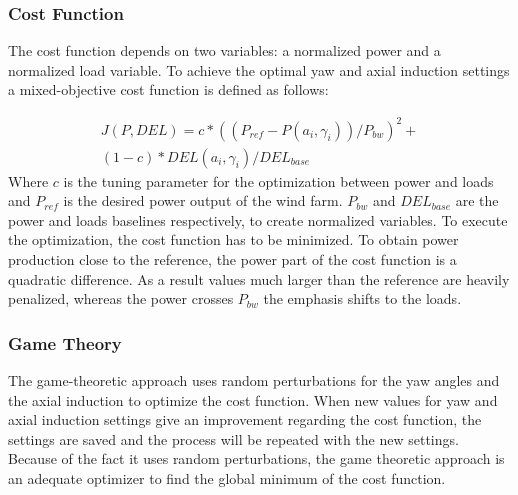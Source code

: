 \subsubsection{Cost Function} \label{sec:costfunction}
The cost function depends on two variables: a normalized power and a normalized load variable. To achieve the optimal yaw and axial induction settings a mixed-objective cost function is defined as follows:

\begin{equation}
\begin{aligned}
J(P,DEL) = c*((P_{ref}-P(a_i,\gamma_i))/P_{bw})^2  + \\
(1-c)*DEL(a_i,\gamma_i)/DEL_{base}
\end{aligned}
 \label{eq:costf}
\end{equation}
Where $c$ is the tuning parameter for the optimization between power and loads and $P_{ref}$ is the desired power output of the wind farm. $P_{bw}$ and $DEL_{base}$ are the power and loads baselines respectively, to create normalized variables.
\newline
To execute the optimization, the cost function has to be minimized. To obtain power production close to the reference, the power part of the cost function is a quadratic difference. As a result values much larger than the reference are heavily penalized, whereas the power crosses $P_{bw}$ the emphasis shifts to the loads.

\subsubsection{Game Theory} \label{sec:gametheory}
The game-theoretic approach uses random perturbations for the yaw angles and the axial induction to optimize the cost function. When new values for yaw and axial induction settings give an improvement regarding the cost function, the settings are saved and the process will be repeated with the new settings. Because of the fact it uses random perturbations, the game theoretic approach is an adequate optimizer to find the global minimum of the cost function.\cite{Dijk2016}




